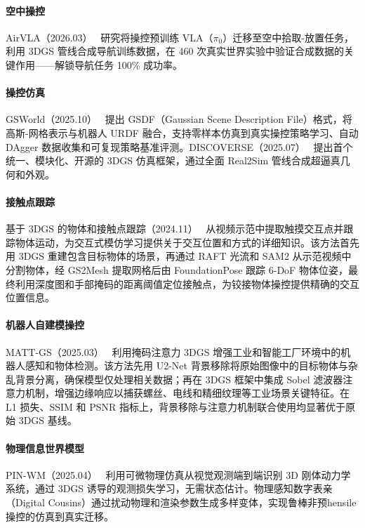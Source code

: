 \paragraph{空中操控}

AirVLA（2026.03）~\cite{2603_25038} 研究将操控预训练 VLA（$\pi_0$）迁移至空中拾取-放置任务，利用 3DGS 管线合成导航训练数据，在 460 次真实世界实验中验证合成数据的关键作用——解锁导航任务 100\% 成功率。

\paragraph{操控仿真}

GSWorld（2025.10）~\cite{2510_20813} 提出 GSDF（Gaussian Scene Description File）格式，将高斯-网格表示与机器人 URDF 融合，支持零样本仿真到真实操控策略学习、自动 DAgger 数据收集和可复现策略基准评测。DISCOVERSE（2025.07）~\cite{2507_21981} 提出首个统一、模块化、开源的 3DGS 仿真框架，通过全面 Real2Sim 管线合成超逼真几何和外观。

\paragraph{接触点跟踪}

基于 3DGS 的物体和接触点跟踪（2024.11）~\cite{2411_03555} 从视频示范中提取触摸交互点并跟踪物体运动，为交互式模仿学习提供关于交互位置和方式的详细知识。该方法首先用 3DGS 重建包含目标物体的场景，再通过 RAFT 光流和 SAM2 从示范视频中分割物体，经 GS2Mesh 提取网格后由 FoundationPose 跟踪 6-DoF 物体位姿，最终利用深度图和手部掩码的距离阈值定位接触点，为铰接物体操控提供精确的交互位置信息。

\paragraph{机器人自建模操控}

MATT-GS（2025.03）~\cite{2503_19330} 利用掩码注意力 3DGS 增强工业和智能工厂环境中的机器人感知和物体检测。该方法先用 U2-Net 背景移除将原始图像中的目标物体与杂乱背景分离，确保模型仅处理相关数据；再在 3DGS 框架中集成 Sobel 滤波器注意力机制，增强边缘响应以捕获螺丝、电线和精细纹理等工业场景关键特征。在 L1 损失、SSIM 和 PSNR 指标上，背景移除与注意力机制联合使用均显著优于原始 3DGS 基线。

\paragraph{物理信息世界模型}

PIN-WM（2025.04）~\cite{2504_16693} 利用可微物理仿真从视觉观测端到端识别 3D 刚体动力学系统，通过 3DGS 诱导的观测损失学习，无需状态估计。物理感知数字表亲（Digital Cousins）通过扰动物理和渲染参数生成多样变体，实现鲁棒非预hensile操控的仿真到真实迁移。

